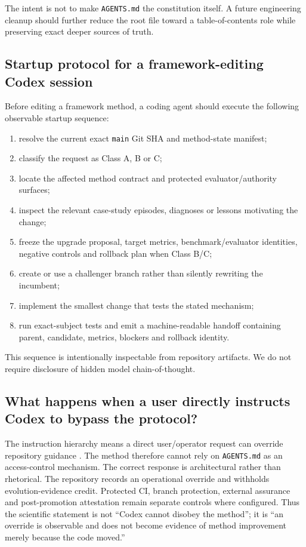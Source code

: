 The intent is not to make \texttt{AGENTS.md} the constitution itself. A future engineering cleanup should further reduce the root file toward a table-of-contents role while preserving exact deeper sources of truth.

\subsection{Startup protocol for a framework-editing Codex session}

Before editing a framework method, a coding agent should execute the following observable startup sequence:

\begin{enumerate}[leftmargin=*]
\item resolve the current exact \texttt{main} Git SHA and method-state manifest;
\item classify the request as Class A, B or C;
\item locate the affected method contract and protected evaluator/authority surfaces;
\item inspect the relevant case-study episodes, diagnoses or lessons motivating the change;
\item freeze the upgrade proposal, target metrics, benchmark/evaluator identities, negative controls and rollback plan when Class B/C;
\item create or use a challenger branch rather than silently rewriting the incumbent;
\item implement the smallest change that tests the stated mechanism;
\item run exact-subject tests and emit a machine-readable handoff containing parent, candidate, metrics, blockers and rollback identity.
\end{enumerate}

This sequence is intentionally inspectable from repository artifacts. We do not require disclosure of hidden model chain-of-thought.

\subsection{What happens when a user directly instructs Codex to bypass the protocol?}

The instruction hierarchy means a direct user/operator request can override repository guidance \cite{openai2025codex}. The method therefore cannot rely on \texttt{AGENTS.md} as an access-control mechanism. The correct response is architectural rather than rhetorical. The repository records an operational override and withholds evolution-evidence credit. Protected CI, branch protection, external assurance and post-promotion attestation remain separate controls where configured. Thus the scientific statement is not ``Codex cannot disobey the method''; it is ``an override is observable and does not become evidence of method improvement merely because the code moved.''

